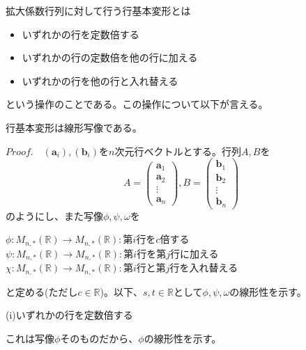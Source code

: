\documentclass[dvipdfmx]{jsarticle}
\begin{document}
\build 拡大係数行列に対して行う行基本変形とは
\begin{itemize}
\item いずれかの行を定数倍する
\item いずれかの行の定数倍を他の行に加える
\item いずれかの行を他の行と入れ替える
\end{itemize}
という操作のことである。この操作について以下が言える。\\\par
{}行基本変形は線形写像である。\\\par
$Proof.$　$(\bm{a}_i),(\bm{b}_i)$を$n$次元行ベクトルとする。行列$A,B$を
\[A=\begin{pmatrix}\bm{a}_1\\\bm{a}_2\\\vdots\\\bm{a}_n\end{pmatrix},B=\begin{pmatrix}\bm{b}_1\\\bm{b}_2\\\vdots\\\bm{b}_n\end{pmatrix}\]
のようにし、また写像$\phi,\psi,\omega$を\newpage
\begin{center}
$\phi:M_{n,\ast}(\mathbb{R}) \to M_{n,\ast}(\mathbb{R}):$第$i$行を$c$倍する\\
$\psi:M_{n,\ast}(\mathbb{R}) \to M_{n,\ast}(\mathbb{R}):$第$i$行を第$j$行に加える\\
$\chi:M_{n,\ast}(\mathbb{R}) \to M_{n,\ast}(\mathbb{R}):$第$i$行と第$j$行を入れ替える
\end{center}
と定める(ただし$c\in\mathbb{R}$)。以下、$s,t\in\mathbb{R}$として$\phi,\psi,\omega$の線形性を示す。\\\par
(i)いずれかの行を定数倍する\par
これは写像$\phi$そのものだから、$\phi$の線形性を示す。
\end{document}
